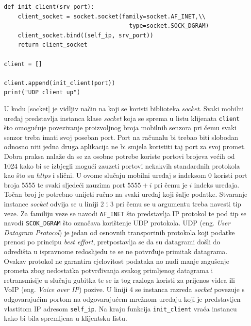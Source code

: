 \documentclass[times, utf8, diplomski]{fer}
\begin{document}
\begin{lstlisting}[caption=Ostvarivanje veze na strani klijenta, label=socket]
def init_client(srv_port):
    client_socket = socket.socket(family=socket.AF_INET,\\
                                    type=socket.SOCK_DGRAM)
    client_socket.bind((self_ip, srv_port))
    return client_socket

client = []

client.append(init_client(port))
print("UDP client up") 
\end{lstlisting}

U kodu \ref{socket} je vidljiv način na koji se koristi biblioteka \textit{socket}. Svaki mobilni uređaj predstavlja instanca klase \textit{socket} koja se sprema
u listu klijenata \texttt{client} što omogućuje povezivanje proizvoljnog broja mobilnih senzora pri čemu svaki senzor treba imati svoj poseban port. Port na računalu
bi trebao biti slobodan odnosno niti jedna druga aplikacija ne bi smjela koristiti taj port za svoj promet. Dobra praksa nalaže da se za osobne potrebe koriste portovi
brojeva većih od 1024 kako bi se izbjegli mogući zauzeti portovi nekakvih standardnih protokola kao što su \textit{https} i slični. U ovome slučaju mobilni uređaj
s indeksom 0 koristi port broja 5555 te svaki sljedeći zauzima port $5555 + i$ pri čemu je $i$ indeks uređaja. Točan broj je potrebno unijeti ručno na svaki uređaj
koji šalje podatke. Stvaranje instance \textit{socket} odvija se u liniji 2 i 3 pri čemu se u argumentu treba navesti tip veze. Za familiju veze se navodi
\texttt{AF\_INET} što predstavlja IP protokol te pod tip se navodi \texttt{SCOK\_DGRAM} što označava korištenje UDP protokola. UDP (eng. \textit{User Datagram Protocol})
je jedan od osnovnih transportnih protokola koji podatke prenosi po principu \textit{best effort}, pretpostavlja se da su datagrami došli do odredišta u ispravnome redoslijedu
te se ne potvrđuje primitak datagrama. Ovakav protokol ne garantira cjelovitost podataka no nudi manje zagušenje prometa zbog nedostatka potvrđivanja svakog primljenog
datagrama i retransmisije u slučaju gubitka te se iz tog razloga koristi za prijenos videa ili VoIP (eng. \textit{Voice over IP}) pozive. U liniji 4 se instanca razreda
\textit{socket} povezuje s odgovarajućim portom na odgovarajućem mrežnom uređaju koji je predstavljen vlastitom IP adresom \texttt{self\_ip}. Na kraju funkcija
\texttt{init\_client} vraća instancu kako bi bila spremljena u klijentsku listu.
\end{document}
